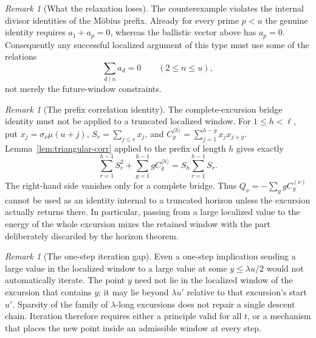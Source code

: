 \documentclass[11pt,reqno]{amsart}
\numberwithin{equation}{section}
\theoremstyle{plain}
\theoremstyle{definition}
\theoremstyle{remark}
\newtheorem{remark}[theorem]{Remark}
\begin{document}
\begin{remark}[What the relaxation loses]
\label{rem:relaxed-loses}
The counterexample violates the internal divisor identities of the M\"obius
prefix.  Already for every prime $p<u$ the genuine identity requires
$a_1+a_p=0$, whereas the ballistic vector above has
$a_p=0$.  Consequently any successful localized argument of this type
must use some of the relations
\begin{equation}
\sum_{d\mid n}a_d=0\qquad(2\le n\le u),
\end{equation}
not merely the future-window constraints.
\end{remark}

\begin{remark}[The prefix correlation identity]
\label{rem:prefix-correlation}
The complete-excursion bridge identity must not be applied to a truncated
localized window.  For $1\le h<\ell$, put
$x_j=\sigma_\nu\mu(u+j)$,
$S_r=\sum_{j\le r}x_j$, and
$C_g^{\langle h\rangle}=\sum_{j=1}^{h-g}x_jx_{j+g}$.  Lemma~\ref{lem:triangular-corr}
applied to the prefix of length $h$ gives exactly
\begin{equation}
\sum_{r=1}^{h-1}S_r^2+\sum_{g=1}^{h-1}gC_g^{\langle h\rangle}
=S_h\sum_{r=1}^{h-1}S_r.
\end{equation}
The right-hand side vanishes only for a complete bridge.  Thus
$Q_\nu=-\sum_g gC_g^{(\nu)}$ cannot be used as an identity internal to a
truncated horizon unless the excursion actually returns there.  In
particular, passing from a large localized value to the energy of the whole
excursion mixes the retained window with the part deliberately discarded by
the horizon theorem.
\end{remark}

\begin{remark}[The one-step iteration gap]
\label{rem:iteration-gap}
Even a one-step implication sending a large value in the localized window
to a large value at some $y\le\lambda u/2$ would not automatically iterate.
The point $y$ need not lie in the localized window of the excursion that
contains $y$; it may lie beyond $\lambda u'$ relative to that excursion's
start $u'$.  Sparsity of the family of $\lambda$-long excursions does not
repair a single descent chain.  Iteration therefore requires either a
principle valid for all $t$, or a mechanism that places the new point inside
an admissible window at every step.
\end{remark}
\end{document}
